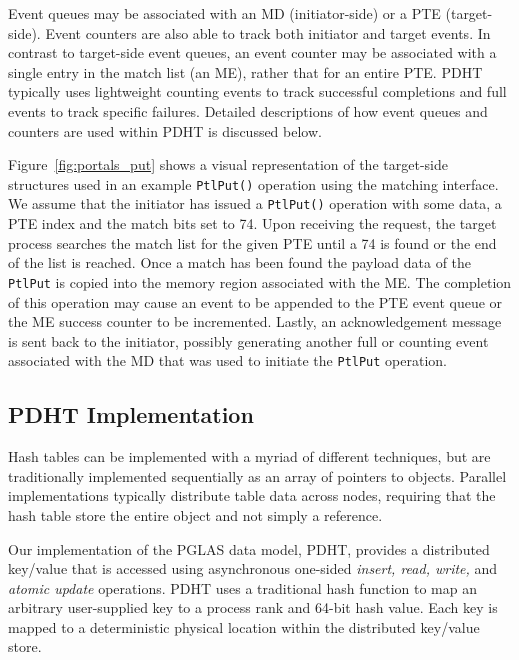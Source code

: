 Event queues may be associated with an MD (initiator-side) or a PTE
(target-side). Event counters are also able to track both initiator
and target events. In contrast to target-side event queues, an event
counter may be associated with a single entry in the match list (an ME), 
rather that for an entire PTE. PDHT typically uses lightweight counting
events to track successful completions and full events to track specific
failures. Detailed descriptions of how event queues and counters are used
within PDHT is discussed below.

Figure~\ref{fig:portals_put} shows a visual representation of the target-side
structures used in an example {\tt PtlPut()} operation using the matching
interface. We assume that the initiator has issued a {\tt PtlPut()} operation
with some data, a PTE index and the match bits set to 74. Upon receiving the
request, the target process searches the match list for the given PTE until a
74 is found or the end of the list is reached. Once a match has been found the
payload data of the {\tt PtlPut} is copied into the memory region associated
with the ME. The completion of this operation may cause an event to be appended
to the PTE event queue or the ME success counter to be incremented. 
Lastly, an acknowledgement message is sent back to the initiator, possibly
generating another full or counting event associated with the MD that
was used to initiate the {\tt PtlPut} operation.



\subsection{PDHT Implementation}

Hash tables can be implemented with a myriad of different techniques, but are
traditionally implemented sequentially as an array of pointers to objects.
Parallel implementations typically distribute table data across nodes,
requiring that the hash table store the entire object and not simply a
reference. 



Our implementation of the PGLAS data model, PDHT, provides a distributed
key/value that is accessed using asynchronous one-sided {\em insert, read,
write,} and {\em atomic update} operations. PDHT uses a traditional hash
function\cite{cityhash} to map an arbitrary user-supplied key to a process rank
and 64-bit hash value. Each key is mapped to a deterministic physical
location within the distributed key/value store.

